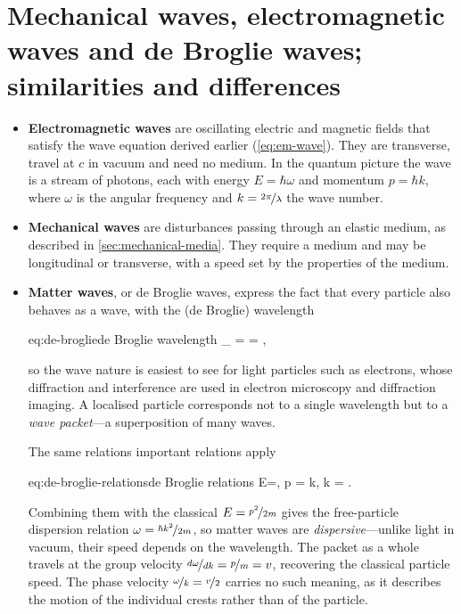\section{Mechanical waves, electromagnetic waves and de Broglie waves; similarities and differences}
\label{sec:wave-types}

    \begin{itemize}
        \item \textbf{Electromagnetic waves} are oscillating electric and magnetic fields that satisfy the wave equation derived earlier (\cref{eq:em-wave}). They are transverse, travel at $c$ in vacuum and need no medium. In the quantum picture the wave is a stream of photons, each with energy $E = \hbar\omega$ and momentum $p = \hbar k$, where $\omega$ is the angular frequency and $k = \nicefrac{2\pi}{\lambda}$ the wave number.
        \item \textbf{Mechanical waves} are disturbances passing through an elastic medium, as described in \cref{sec:mechanical-media}. They require a medium and may be longitudinal or transverse, with a speed set by the properties of the medium.
        \item \textbf{Matter waves}, or de Broglie waves, express the fact that every particle also behaves as a wave, with the (de Broglie) wavelength
        \begin{keyeq}{eq:de-broglie}{de Broglie wavelength}
            \lambda_{} =  = ,
        \end{keyeq}
        so the wave nature is easiest to see for light particles such as electrons, whose diffraction and interference are used in electron microscopy and diffraction imaging. A localised particle corresponds not to a single wavelength but to a \emph{wave packet}---a superposition of many waves. 
        
        The same relations important relations apply
        \begin{keyeq}{eq:de-broglie-relations}{de Broglie relations}
            E=\hbar\omega, \quad p = \hbar k, \quad k = \frac{2\pi}{\lambda}.
        \end{keyeq}
        Combining them with the classical $E = \nicefrac{p^{2}}{2m}$ gives the free-particle dispersion relation $\omega = \nicefrac{\hbar k^{2}}{2m}$, so matter waves are \emph{dispersive}---unlike light in vacuum, their speed depends on the wavelength. The packet as a whole travels at the group velocity $\nicefrac{d\omega}{dk} = \nicefrac{p}{m} = v$, recovering the classical particle speed. The phase velocity $\nicefrac{\omega}{k} = \nicefrac{v}{2}$ carries no such meaning, as it describes the motion of the individual crests rather than of the particle.
    \end{itemize}

